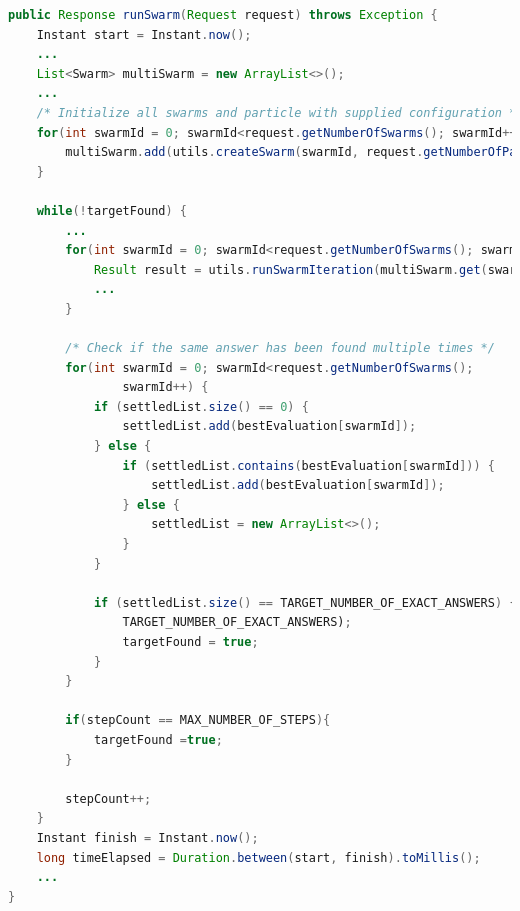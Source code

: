 \documentclass[oneside,12pt]{book}
\begin{document}
\begin{lstlisting}[basicstyle=\footnotesize, language=Java]
public Response runSwarm(Request request) throws Exception {
    Instant start = Instant.now();
    ...
    List<Swarm> multiSwarm = new ArrayList<>();
    ...
    /* Initialize all swarms and particle with supplied configuration */
    for(int swarmId = 0; swarmId<request.getNumberOfSwarms(); swarmId++) {
        multiSwarm.add(utils.createSwarm(swarmId, request.getNumberOfParticles(), request.getConfigVariables()));
    }

    while(!targetFound) {
        ...
        for(int swarmId = 0; swarmId<request.getNumberOfSwarms(); swarmId++) {
            Result result = utils.runSwarmIteration(multiSwarm.get(swarmId), stepCount);
            ...
        }
        
        /* Check if the same answer has been found multiple times */
        for(int swarmId = 0; swarmId<request.getNumberOfSwarms(); 
                swarmId++) {
            if (settledList.size() == 0) {
                settledList.add(bestEvaluation[swarmId]);
            } else {
                if (settledList.contains(bestEvaluation[swarmId])) {
                    settledList.add(bestEvaluation[swarmId]);
                } else {
                    settledList = new ArrayList<>();
                }
            }

            if (settledList.size() == TARGET_NUMBER_OF_EXACT_ANSWERS) {
                TARGET_NUMBER_OF_EXACT_ANSWERS);
                targetFound = true;
            }
        }

        if(stepCount == MAX_NUMBER_OF_STEPS){
            targetFound =true;
        }

        stepCount++;
    }
    Instant finish = Instant.now();
    long timeElapsed = Duration.between(start, finish).toMillis();
    ...
}
\end{lstlisting}
\label{listing:CentralisedServiceMethod}
\end{document}

